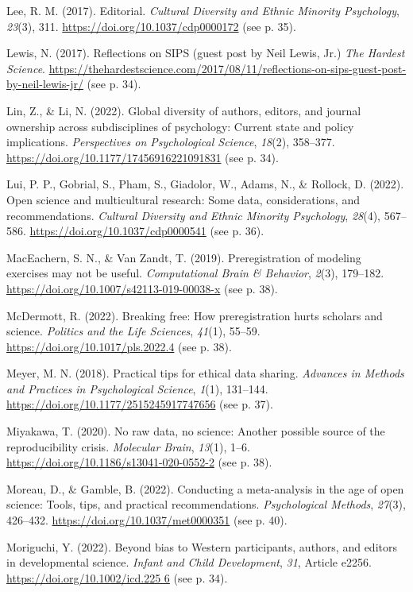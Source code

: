 \documentclass[authordate, empirical,issue]{jote-new-article}
\begin{document}
Lee, R. M. (2017). Editorial. \emph{Cultural Diversity and Ethnic Minority Psychology}, \emph{23}(3), 311. \url{https://doi.org/10.1037/cdp0000172} (see p. 35).

Lewis, N. (2017). Reflections on SIPS (guest post by Neil Lewis, Jr.) \emph{The Hardest Science}. \url{https://thehardestscience.com/2017/08/11/reflections-on-sips-guest-post-by-neil-lewis-jr/} (see p. 34).

Lin, Z., \& Li, N. (2022). Global diversity of authors, editors, and journal ownership across subdisciplines of psychology: Current state and policy implications. \emph{Perspectives on Psychological Science}, \emph{18}(2), 358–377. \url{https://doi.org/10.1177/17456916221091831} (see p. 34).

Lui, P. P., Gobrial, S., Pham, S., Giadolor, W., Adams, N., \& Rollock, D. (2022). Open science and multicultural research: Some data, considerations, and recommendations. \emph{Cultural Diversity and Ethnic Minority Psychology}, \emph{28}(4), 567–586. \url{https://doi.org/10.1037/cdp0000541} (see p. 36).

MacEachern, S. N., \& Van Zandt, T. (2019). Preregistration of modeling exercises may not be useful. \emph{Computational Brain \& Behavior}, \emph{2}(3), 179–182. \url{https://doi.org/10.1007/s42113-019-00038-x} (see p. 38).

McDermott, R. (2022). Breaking free: How preregistration hurts scholars and science. \emph{Politics and the Life Sciences}, \emph{41}(1), 55–59. \url{https://doi.org/10.1017/pls.2022.4} (see p. 38).

Meyer, M. N. (2018). Practical tips for ethical data sharing. \emph{Advances in Methods and Practices in Psychological Science}, \emph{1}(1), 131–144. \url{https://doi.org/10.1177/2515245917747656} (see p. 37).

Miyakawa, T. (2020). No raw data, no science: Another possible source of the reproducibility crisis. \emph{Molecular Brain}, \emph{13}(1), 1–6. \url{https://doi.org/10.1186/s13041-020-0552-2} (see p. 38).

Moreau, D., \& Gamble, B. (2022). Conducting a meta-analysis in the age of open science: Tools, tips, and practical recommendations. \emph{Psychological Methods}, \emph{27}(3), 426–432. \url{https://doi.org/10.1037/met0000351} (see p. 40).

Moriguchi, Y. (2022). Beyond bias to Western participants, authors, and editors in developmental science. \emph{Infant and Child Development}, \emph{31}, Article e2256. \url{https://doi.org/10.1002/icd.225 6} (see p. 34).
\end{document}
